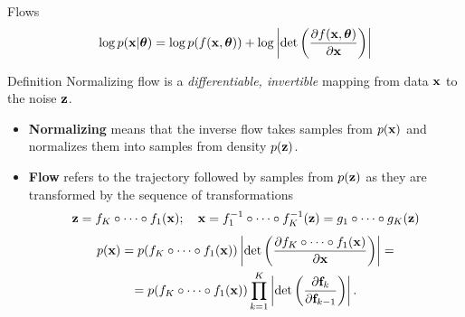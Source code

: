 \begin{frame}{Flows}
	\vspace{-0.3cm}
	\[
		\log p(\mathbf{x}|\boldsymbol{\theta}) = \log p(f(\mathbf{x}, \boldsymbol{\theta})) + \log \left|\det \left( \frac{\partial f(\mathbf{x}, \boldsymbol{\theta})}{\partial \mathbf{x}} \right) \right|
	\]
	\vspace{-0.3cm}
	\begin{block}{Definition}
		Normalizing flow is a \textit{differentiable, invertible} mapping from data $\mathbf{x}$ to the noise $\mathbf{z}$. 
	\end{block}
	\begin{itemize}
		\item \textbf{Normalizing} means that the inverse flow takes samples from $p(\mathbf{x})$ and normalizes them into samples from density $p(\mathbf{z})$.
		\item \textbf{Flow} refers to the trajectory followed by samples from $p(\mathbf{z})$ as they are transformed by the sequence of transformations
		\[
		\mathbf{z} = f_K \circ \dots \circ f_1(\mathbf{x}); \quad \mathbf{x} = f_1^{-1} \circ \dots \circ f_K^{-1} (\mathbf{z}) = g_1 \circ \dots \circ g_K(\mathbf{z}) 
		\] 
		\begin{multline*}
			p(\mathbf{x}) = p(f_K \circ \dots \circ f_1(\mathbf{x})) \left|\det \left(\frac{\partial f_K \circ \dots \circ f_1(\mathbf{x})}{\partial \mathbf{x}} \right) \right| = \\
			= p(f_K \circ \dots \circ f_1(\mathbf{x})) \prod_{k=1}^K \left|\det \left(\frac{\partial \mathbf{f}_k}{\partial \mathbf{f}_{k-1}} \right) \right|.
		\end{multline*}
	\end{itemize}
\end{frame}
